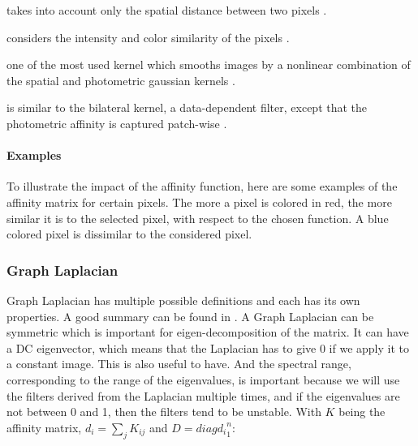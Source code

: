 \documentclass[]{article}
\begin{document}
\begin{description}[align=left]
 \item [Spatial Gaussian Kernel] takes into account only the spatial distance between two pixels \cite{siam_slides_2016}.
 \item [Photometric Gaussian Kernel] considers the intensity and color similarity of the pixels \cite{siam_slides_2016}.
 \item [Bilateral Kernel] one of the most used kernel which smooths images by a nonlinear combination of the spatial and photometric gaussian kernels \cite{siam_slides_2016} \cite{glide_2014}.
 \item [Non-Local Means (NLM)] is similar to the bilateral kernel, a data-dependent filter, except that the photometric affinity is captured patch-wise \cite{glide_2014}.
\end{description}

\paragraph{Examples}

To illustrate the impact of the affinity function, here are some examples of the affinity matrix for certain pixels.
The more a pixel is colored in red, the more similar it is to the selected pixel, with respect to the chosen function.
A blue colored pixel is dissimilar to the considered pixel.




\subsubsection{Graph Laplacian}
Graph Laplacian has multiple possible definitions and each has its own properties.
A good summary can be found in \cite{siam_slides_2016}.
A Graph Laplacian can be symmetric which is important for eigen-decomposition of the matrix.
It can have a DC eigenvector, which means that the Laplacian has to give 0 if we apply it to a constant image. This is also useful to have.
And the spectral range, corresponding to the range of the eigenvalues, is important because we will use the filters derived from the Laplacian multiple times, and if the eigenvalues are not between 0 and 1, then the filters tend to be unstable.
With \(K\) being the affinity matrix, \(d_i = \sum_j K_{ij}\) and \(D = diag{d_i}^n_1\):
\end{document}
